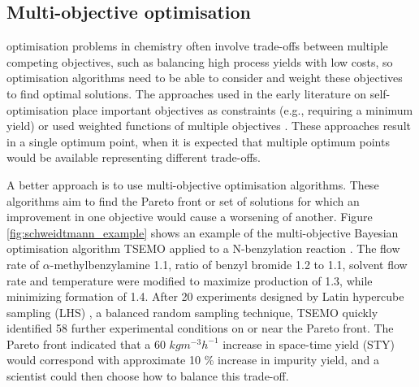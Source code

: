 \subsection{Multi-objective optimisation}
optimisation problems in chemistry often involve trade-offs between multiple competing objectives, such as balancing high process yields with low costs, so optimisation algorithms need to be able to consider and weight these objectives to find optimal solutions. The approaches used in the early literature on self-optimisation place important objectives as constraints (e.g., requiring a minimum yield) \cite{Reizman2015b, Reizman2016a, Reizman2016b, Baumgartner2018} or used weighted functions of multiple objectives \cite{Krishnadasan2007, Fitzpatrick2016, Hase2018b}. These approaches result in a single optimum point, when it is expected that multiple optimum points would be available representing different trade-offs.


A better approach is to use multi-objective optimisation algorithms. These algorithms aim to find the Pareto front or set of solutions for which an improvement in one objective would cause a worsening of another. Figure \ref{fig:schweidtmann_example} shows an example of the multi-objective Bayesian optimisation algorithm TSEMO \cite{Bradford2018} applied to a N-benzylation reaction \cite{Schweidtmann2018}. The flow rate of $\alpha$-methylbenzylamine 1.1, ratio of benzyl bromide 1.2 to 1.1, solvent flow rate and temperature were modified to maximize production of 1.3, while minimizing formation of 1.4. After 20 experiments designed by Latin hypercube sampling (LHS) \cite{McKay1979}, a balanced random sampling technique, TSEMO quickly identified 58 further experimental conditions on or near the Pareto front. The Pareto front indicated that a 60 $kg m^{-3} h^{-1}$ increase in space-time yield (STY) would correspond with approximate 10 \% increase in impurity yield, and a scientist could then choose how to balance this trade-off.

